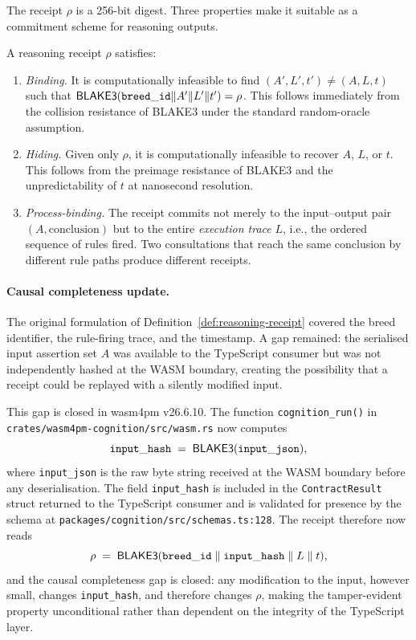The receipt $\rho$ is a 256-bit digest.  Three properties make it suitable as a
commitment scheme for reasoning outputs.

\begin{definition}
\label{def:receipt-properties}
A reasoning receipt $\rho$ satisfies:
\begin{enumerate}[label=(\roman*)]
  \item \emph{Binding.}  It is computationally infeasible to find
        $(A', L', t') \neq (A, L, t)$ such that
        $\mathsf{BLAKE3}(\mathtt{breed\_id} \| A' \| L' \| t') = \rho$.
        This follows immediately from the collision resistance of BLAKE3 under
        the standard random-oracle assumption.

  \item \emph{Hiding.}  Given only $\rho$, it is computationally infeasible to
        recover $A$, $L$, or $t$.  This follows from the preimage resistance of BLAKE3
        and the unpredictability of $t$ at nanosecond resolution.

  \item \emph{Process-binding.}  The receipt commits not merely to the input--output
        pair $(A, \text{conclusion})$ but to the entire \emph{execution trace} $L$,
        i.e., the ordered sequence of rules fired.  Two consultations that reach the
        same conclusion by different rule paths produce different receipts.
\end{enumerate}
\end{definition}

\paragraph{Causal completeness update.}
The original formulation of Definition~\ref{def:reasoning-receipt} covered the breed
identifier, the rule-firing trace, and the timestamp.  A gap remained: the serialised
input assertion set $A$ was available to the TypeScript consumer but was not independently
hashed at the WASM boundary, creating the possibility that a receipt could be replayed
with a silently modified input.

This gap is closed in wasm4pm v26.6.10.  The function \texttt{cognition\_run()} in
\texttt{crates/wasm4pm-cognition/src/wasm.rs} now computes
\[
  \mathtt{input\_hash} \;=\; \mathsf{BLAKE3}(\mathtt{input\_json}),
\]
where \texttt{input\_json} is the raw byte string received at the WASM boundary before
any deserialisation.  The field \texttt{input\_hash} is included in the
\texttt{ContractResult} struct returned to the TypeScript consumer and is validated for
presence by the schema at \texttt{packages/cognition/src/schemas.ts:128}.  The receipt
therefore now reads
\[
  \rho \;=\; \mathsf{BLAKE3}(\mathtt{breed\_id} \;\|\; \mathtt{input\_hash} \;\|\; L \;\|\; t),
\]
and the causal completeness gap is closed: any modification to the input, however small,
changes \texttt{input\_hash}, and therefore changes $\rho$, making the tamper-evident
property unconditional rather than dependent on the integrity of the TypeScript layer.

